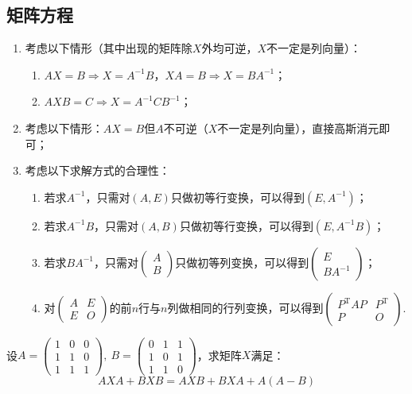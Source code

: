 \subsection{矩阵方程}
\begin{enumerate}
	\item 考虑以下情形（其中出现的矩阵除$X$外均可逆，$X$不一定是列向量）：
	\begin{enumerate}
		\item $AX=B \Rightarrow X=A^{-1}B$，$XA=B \Rightarrow X=BA^{-1}$；
		\item $AXB=C \Rightarrow X=A^{-1}CB^{-1}$；
	\end{enumerate}
	\item 考虑以下情形：$AX=B$但$A$不可逆（$X$不一定是列向量），直接高斯消元即可；
	\item 考虑以下求解方式的合理性：
	\begin{enumerate}
		\item 若求$A^{-1}$，只需对$(A,E)$只做初等行变换，可以得到$(E,A^{-1})$；
		\item 若求$A^{-1}B$，只需对$(A,B)$只做初等行变换，可以得到$(E,A^{-1}B)$；
		\item 若求$BA^{-1}$，只需对$\begin{pmatrix}
			A \\ B
		\end{pmatrix}$只做初等列变换，可以得到$\begin{pmatrix}
			E \\ BA^{-1}
		\end{pmatrix}$；
		\item 对$\begin{pmatrix}
			A & E \\ E & O
		\end{pmatrix}$的前$n$行与$n$列做相同的行列变换，可以得到$\begin{pmatrix}
			P^\mathrm{T}AP & P^\mathrm{T} \\ P & O
		\end{pmatrix}$.
	\end{enumerate}
\end{enumerate}

\begin{example}
	设$A=\begin{pmatrix}1 & 0 & 0 \\ 1 & 1 & 0 \\ 1 & 1 & 1\end{pmatrix},\ 
	B=\begin{pmatrix}0 & 1 & 1 \\ 1 & 0 & 1 \\ 1 & 1 & 0\end{pmatrix}$，求矩阵$X$满足：	
	$$AXA+BXB=AXB+BXA+A(A-B)$$
\end{example}

